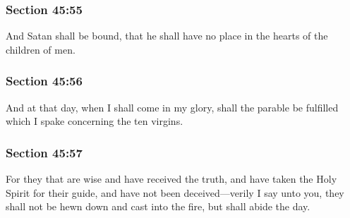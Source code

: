 
	\subsubsection{Section 45:55} %
		\label{DC45-55}

		And Satan shall be bound, that he shall have no place in the hearts of the children of men.


	\subsubsection{Section 45:56} %
		\label{DC45-56}

		And at that day, when I shall come in my glory, shall the parable be fulfilled which I spake concerning the ten virgins.


	\subsubsection{Section 45:57} %
		\label{DC45-57}

		For they that are wise and have received the truth, and have taken the Holy Spirit for their guide, and have not been deceived---verily I say unto you, they shall not be hewn down and cast into the fire, but shall abide the day.

